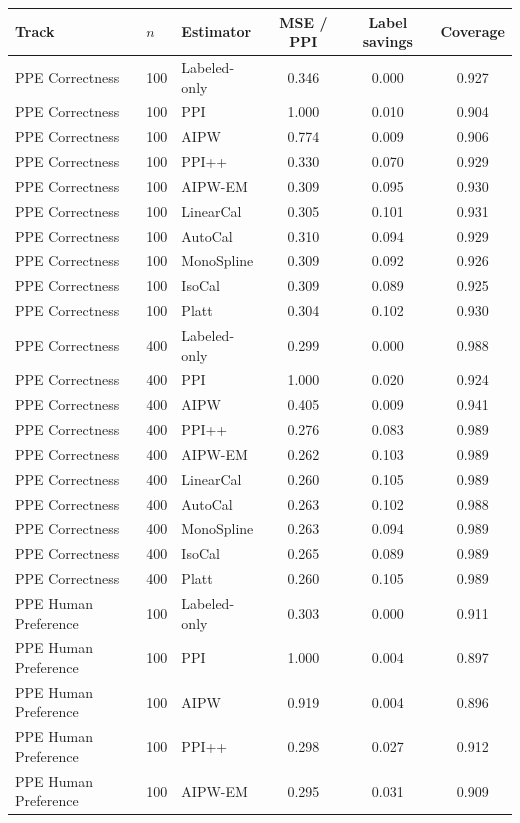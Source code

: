 \begin{tabular}{lllccc}
\toprule
Track & $n$ & Estimator & MSE / PPI & Label savings & Coverage \\
\midrule
PPE Correctness & 100 & Labeled-only & 0.346 & 0.000 & 0.927 \\
PPE Correctness & 100 & PPI & 1.000 & 0.010 & 0.904 \\
PPE Correctness & 100 & AIPW & 0.774 & 0.009 & 0.906 \\
PPE Correctness & 100 & PPI++ & 0.330 & 0.070 & 0.929 \\
PPE Correctness & 100 & AIPW-EM & 0.309 & 0.095 & 0.930 \\
PPE Correctness & 100 & LinearCal & 0.305 & 0.101 & 0.931 \\
PPE Correctness & 100 & AutoCal & 0.310 & 0.094 & 0.929 \\
PPE Correctness & 100 & MonoSpline & 0.309 & 0.092 & 0.926 \\
PPE Correctness & 100 & IsoCal & 0.309 & 0.089 & 0.925 \\
PPE Correctness & 100 & Platt & 0.304 & 0.102 & 0.930 \\
PPE Correctness & 400 & Labeled-only & 0.299 & 0.000 & 0.988 \\
PPE Correctness & 400 & PPI & 1.000 & 0.020 & 0.924 \\
PPE Correctness & 400 & AIPW & 0.405 & 0.009 & 0.941 \\
PPE Correctness & 400 & PPI++ & 0.276 & 0.083 & 0.989 \\
PPE Correctness & 400 & AIPW-EM & 0.262 & 0.103 & 0.989 \\
PPE Correctness & 400 & LinearCal & 0.260 & 0.105 & 0.989 \\
PPE Correctness & 400 & AutoCal & 0.263 & 0.102 & 0.988 \\
PPE Correctness & 400 & MonoSpline & 0.263 & 0.094 & 0.989 \\
PPE Correctness & 400 & IsoCal & 0.265 & 0.089 & 0.989 \\
PPE Correctness & 400 & Platt & 0.260 & 0.105 & 0.989 \\
PPE Human Preference & 100 & Labeled-only & 0.303 & 0.000 & 0.911 \\
PPE Human Preference & 100 & PPI & 1.000 & 0.004 & 0.897 \\
PPE Human Preference & 100 & AIPW & 0.919 & 0.004 & 0.896 \\
PPE Human Preference & 100 & PPI++ & 0.298 & 0.027 & 0.912 \\
PPE Human Preference & 100 & AIPW-EM & 0.295 & 0.031 & 0.909 \\

\end{tabular}
